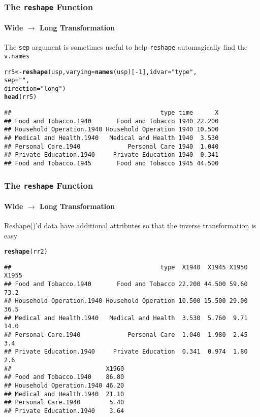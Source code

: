 \documentclass[paper=screen,mathserif]{beamer}\usepackage[]{graphicx}\usepackage[]{color}
\makeatletter
\newcommand{\hlnum}[1]{\textcolor[rgb]{0.686,0.059,0.569}{#1}}%
\newcommand{\hlstr}[1]{\textcolor[rgb]{0.192,0.494,0.8}{#1}}%
\newcommand{\hlopt}[1]{\textcolor[rgb]{0,0,0}{#1}}%
\newcommand{\hlstd}[1]{\textcolor[rgb]{0.345,0.345,0.345}{#1}}%
\newcommand{\hlkwb}[1]{\textcolor[rgb]{0.69,0.353,0.396}{#1}}%
\newcommand{\hlkwc}[1]{\textcolor[rgb]{0.333,0.667,0.333}{#1}}%
\newcommand{\hlkwd}[1]{\textcolor[rgb]{0.737,0.353,0.396}{\textbf{#1}}}%
\newenvironment{kframe}{%
 \def\at@end@of@kframe{}%
 \ifinner\ifhmode%
  \def\at@end@of@kframe{\end{minipage}}%
  \begin{minipage}{\columnwidth}%
 \fi\fi%
 \def\FrameCommand##1{\hskip\@totalleftmargin \hskip-\fboxsep
 \colorbox{shadecolor}{##1}\hskip-\fboxsep
     \hskip-\linewidth \hskip-\@totalleftmargin \hskip\columnwidth}%
 \MakeFramed {\advance\hsize-\width
   \@totalleftmargin\z@ \linewidth\hsize
   \@setminipage}}%
 {\par\unskip\endMakeFramed%
 \at@end@of@kframe}
\newenvironment{knitrout}{}{} %
\newcommand{\ft}[1]{\frametitle{#1}}
\newcommand{\fst}[1]{\framesubtitle{#1}}
\makeatother
\begin{document}
\begin{frame}[fragile]
  \ft{The {\tt reshape} Function}
  \fst{Wide $\rightarrow$ Long Transformation}
  
  The \verb=sep= argument is sometimes useful to help \verb=reshape=
  automagically find the \verb=v.names=

\begin{knitrout}\scriptsize
{}\color{fgcolor}\begin{kframe}
\begin{alltt}
\hlstd{rr5} \hlkwb{<-} \hlkwd{reshape}\hlstd{(usp,} \hlkwc{varying} \hlstd{=} \hlkwd{names}\hlstd{(usp)[}\hlopt{-}\hlnum{1}\hlstd{],} \hlkwc{idvar} \hlstd{=} \hlstr{"type"}\hlstd{,}
               \hlkwc{sep} \hlstd{=} \hlstr{""}\hlstd{,}
               \hlkwc{direction} \hlstd{=} \hlstr{"long"}\hlstd{)}
\hlkwd{head}\hlstd{(rr5)}
\end{alltt}
\begin{verbatim}
##                                         type time      X
## Food and Tobacco.1940       Food and Tobacco 1940 22.200
## Household Operation.1940 Household Operation 1940 10.500
## Medical and Health.1940   Medical and Health 1940  3.530
## Personal Care.1940             Personal Care 1940  1.040
## Private Education.1940     Private Education 1940  0.341
## Food and Tobacco.1945       Food and Tobacco 1945 44.500
\end{verbatim}
\end{kframe}
\end{knitrout}
\end{frame}

\begin{frame}[fragile]
  \ft{The {\tt reshape} Function}
  \fst{Wide $\rightarrow$ Long Transformation}
  
  Reshape()'d data have additional attributes so that the inverse
  transformation is easy 
\begin{knitrout}\scriptsize
{}\color{fgcolor}\begin{kframe}
\begin{alltt}
\hlkwd{reshape}\hlstd{(rr2)}
\end{alltt}
\begin{verbatim}
##                                         type  X1940  X1945 X1950 X1955
## Food and Tobacco.1940       Food and Tobacco 22.200 44.500 59.60  73.2
## Household Operation.1940 Household Operation 10.500 15.500 29.00  36.5
## Medical and Health.1940   Medical and Health  3.530  5.760  9.71  14.0
## Personal Care.1940             Personal Care  1.040  1.980  2.45   3.4
## Private Education.1940     Private Education  0.341  0.974  1.80   2.6
##                          X1960
## Food and Tobacco.1940    86.80
## Household Operation.1940 46.20
## Medical and Health.1940  21.10
## Personal Care.1940        5.40
## Private Education.1940    3.64
\end{verbatim}
\end{kframe}
\end{knitrout}

\end{frame}
\end{document}
